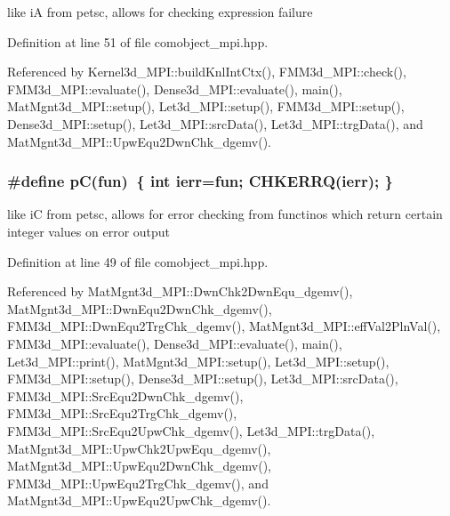 like i\-A from petsc, allows for checking expression failure 

Definition at line 51 of file comobject\_\-mpi.hpp.

Referenced by Kernel3d\_\-MPI::build\-Knl\-Int\-Ctx(), FMM3d\_\-MPI::check(), FMM3d\_\-MPI::evaluate(), Dense3d\_\-MPI::evaluate(), main(), Mat\-Mgnt3d\_\-MPI::setup(), Let3d\_\-MPI::setup(), FMM3d\_\-MPI::setup(), Dense3d\_\-MPI::setup(), Let3d\_\-MPI::src\-Data(), Let3d\_\-MPI::trg\-Data(), and Mat\-Mgnt3d\_\-MPI::Upw\-Equ2Dwn\-Chk\_\-dgemv().
\subsubsection{\setlength{\rightskip}{0pt plus 5cm}\#define p\-C(fun)~\{ int ierr=fun; CHKERRQ(ierr); \}}\label{comobject__mpi_8hpp_b1b5a5fc3c0779898c5d4ef4d63f212e_b1b5a5fc3c0779898c5d4ef4d63f212e}


like i\-C from petsc, allows for error checking from functinos which return certain integer values on error output 

Definition at line 49 of file comobject\_\-mpi.hpp.

Referenced by Mat\-Mgnt3d\_\-MPI::Dwn\-Chk2Dwn\-Equ\_\-dgemv(), Mat\-Mgnt3d\_\-MPI::Dwn\-Equ2Dwn\-Chk\_\-dgemv(), FMM3d\_\-MPI::Dwn\-Equ2Trg\-Chk\_\-dgemv(), Mat\-Mgnt3d\_\-MPI::eff\-Val2Pln\-Val(), FMM3d\_\-MPI::evaluate(), Dense3d\_\-MPI::evaluate(), main(), Let3d\_\-MPI::print(), Mat\-Mgnt3d\_\-MPI::setup(), Let3d\_\-MPI::setup(), FMM3d\_\-MPI::setup(), Dense3d\_\-MPI::setup(), Let3d\_\-MPI::src\-Data(), FMM3d\_\-MPI::Src\-Equ2Dwn\-Chk\_\-dgemv(), FMM3d\_\-MPI::Src\-Equ2Trg\-Chk\_\-dgemv(), FMM3d\_\-MPI::Src\-Equ2Upw\-Chk\_\-dgemv(), Let3d\_\-MPI::trg\-Data(), Mat\-Mgnt3d\_\-MPI::Upw\-Chk2Upw\-Equ\_\-dgemv(), Mat\-Mgnt3d\_\-MPI::Upw\-Equ2Dwn\-Chk\_\-dgemv(), FMM3d\_\-MPI::Upw\-Equ2Trg\-Chk\_\-dgemv(), and Mat\-Mgnt3d\_\-MPI::Upw\-Equ2Upw\-Chk\_\-dgemv().